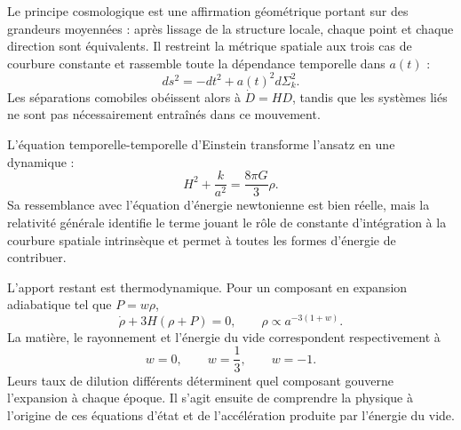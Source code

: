 Le principe cosmologique est une affirmation géométrique portant sur des grandeurs moyennées : après lissage de la structure locale, chaque point et chaque direction sont équivalents. Il restreint la métrique spatiale aux trois cas de courbure constante et rassemble toute la dépendance temporelle dans \(a(t)\) :
\begin{equation}
ds^2=-dt^2+a(t)^2d\Sigma_k^2.
\end{equation}
Les séparations comobiles obéissent alors à \(\dot D=HD\), tandis que les systèmes liés ne sont pas nécessairement entraînés dans ce mouvement.

L’équation temporelle-temporelle d’Einstein transforme l’ansatz en une dynamique :
\begin{equation}
H^2+\frac{k}{a^2}=\frac{8\pi G}{3}\rho.
\end{equation}
Sa ressemblance avec l’équation d’énergie newtonienne est bien réelle, mais la relativité générale identifie le terme jouant le rôle de constante d’intégration à la courbure spatiale intrinsèque et permet à toutes les formes d’énergie de contribuer.

L’apport restant est thermodynamique. Pour un composant en expansion adiabatique tel que \(P=w\rho\),
\begin{equation}
\dot\rho+3H(\rho+P)=0,
\qquad
\rho\propto a^{-3(1+w)}.
\end{equation}
La matière, le rayonnement et l’énergie du vide correspondent respectivement à
\begin{equation}
w=0,\qquad w=\frac13,\qquad w=-1.
\end{equation}
Leurs taux de dilution différents déterminent quel composant gouverne l’expansion à chaque époque. Il s’agit ensuite de comprendre la physique à l’origine de ces équations d’état et de l’accélération produite par l’énergie du vide.

